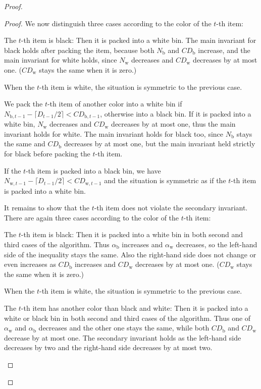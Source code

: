 \documentclass[11pt,a4paper]{article}
\def\vari#1{\mathit{#1}}
\begin{document}
\begin{proof}
\begin{proof}
We now distinguish three cases according to the color of the $t$-th item:
\begin{compactitem}
\item The $t$-th item is black: Then it is packed into a white bin.
The main invariant for black holds after packing the item, because
both $N_{\mathrm{b}}$ and $\vari{CD}_{\mathrm{b}}$ increase, 
and the main invariant for white holds, since
$N_{\mathrm{w}}$ decreases and $\vari{CD}_{\mathrm{w}}$ decreases by at most one.
($\vari{CD}_{\mathrm{w}}$ stays the same when it is zero.)
\item When the $t$-th item is white, the situation is symmetric to the previous case.
\item We pack the $t$-th item of another color into a white bin if
$N_{\mathrm{b},t-1} - \lceil D_{t-1}/2\rceil < \vari{CD}_{\mathrm{b},t-1}$,
otherwise into a black bin. 
If it is packed into a white bin, $N_{\mathrm{w}}$ decreases and $\vari{CD}_{\mathrm{w}}$ decreases by at most one,
thus the main invariant holds for white.
The main invariant holds for black too, since $N_{\mathrm{b}}$ stays the same
and $\vari{CD}_{\mathrm{b}}$ decreases by at most one, but the main invariant held strictly for black
before packing the $t$-th item.

If the $t$-th item is packed into a black bin,
we have $N_{\mathrm{w},t-1} - \lceil D_{t-1}/2\rceil < \vari{CD}_{\mathrm{w},t-1}$
and the situation is symmetric as if the $t$-th item is packed into a white bin.
\end{compactitem}

It remains to show that the $t$-th item does not violate the secondary invariant.
There are again three cases according to the color of the $t$-th item:
\begin{compactitem}
\item The $t$-th item is black: Then it is packed into a white bin in both second and third cases of the algorithm.
Thus $\alpha_{\mathrm{b}}$ increases and $\alpha_{\mathrm{w}}$ decreases,
so the left-hand side of the inequality stays the same.
Also the right-hand side does not change or even increases as $\vari{CD}_{\mathrm{b}}$ increases
and $\vari{CD}_{\mathrm{w}}$ decreases by at most one. ($\vari{CD}_{\mathrm{w}}$ stays the same when it is zero.)
\item When the $t$-th item is white, the situation is symmetric to the previous case.
\item The $t$-th item has another color than black and white:
Then it is packed into a white or black bin in both second and third cases of the algorithm.
Thus one of $\alpha_{\mathrm{w}}$ and $\alpha_{\mathrm{b}}$ decreases and the other one stays the same,
while both $\vari{CD}_{\mathrm{b}}$ and $\vari{CD}_{\mathrm{w}}$ decrease by at most one.
The secondary invariant holds as the left-hand side decreases by two
and the right-hand side decreases by at most two.
\end{compactitem}


\end{proof}
\end{proof}
\end{document}
